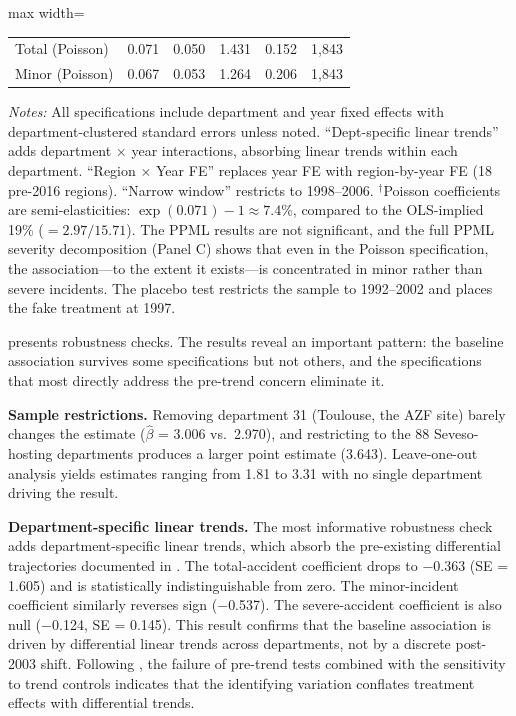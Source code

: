 \documentclass[12pt]{article}
\begin{document}
\begin{table}[H]
\begin{adjustbox}{max width=\textwidth}
\begin{tabular}{lccccc}
Total (Poisson) & 0.071 & 0.050 & 1.431 & 0.152 & 1,843 \\
Minor (Poisson) & 0.067 & 0.053 & 1.264 & 0.206 & 1,843 \\
\bottomrule
\end{tabular}
\end{adjustbox}
\par\vspace{0.3em}
{\footnotesize \textit{Notes:} All specifications include department and year fixed effects with department-clustered standard errors unless noted. ``Dept-specific linear trends'' adds department $\times$ year interactions, absorbing linear trends within each department. ``Region $\times$ Year FE'' replaces year FE with region-by-year FE (18 pre-2016 regions). ``Narrow window'' restricts to 1998--2006. $^{\dagger}$Poisson coefficients are semi-elasticities: $\exp(0.071) - 1 \approx 7.4\%$, compared to the OLS-implied 19\% ($= 2.97/15.71$). The PPML results are not significant, and the full PPML severity decomposition (Panel C) shows that even in the Poisson specification, the association---to the extent it exists---is concentrated in minor rather than severe incidents. The placebo test restricts the sample to 1992--2002 and places the fake treatment at 1997.}
\end{table}

 presents robustness checks. The results reveal an important pattern: the baseline association survives some specifications but not others, and the specifications that most directly address the pre-trend concern eliminate it.

\textbf{Sample restrictions.} Removing department 31 (Toulouse, the AZF site) barely changes the estimate ($\hat{\beta}$ = 3.006 vs.\ 2.970), and restricting to the 88 Seveso-hosting departments produces a larger point estimate (3.643). Leave-one-out analysis yields estimates ranging from 1.81 to 3.31 with no single department driving the result.

\textbf{Department-specific linear trends.} The most informative robustness check adds department-specific linear trends, which absorb the pre-existing differential trajectories documented in . The total-accident coefficient drops to $-$0.363 (SE = 1.605) and is statistically indistinguishable from zero. The minor-incident coefficient similarly reverses sign ($-$0.537). The severe-accident coefficient is also null ($-$0.124, SE = 0.145). This result confirms that the baseline association is driven by differential linear trends across departments, not by a discrete post-2003 shift. Following \citet{roth2022}, the failure of pre-trend tests combined with the sensitivity to trend controls indicates that the identifying variation conflates treatment effects with differential trends.
\end{document}
